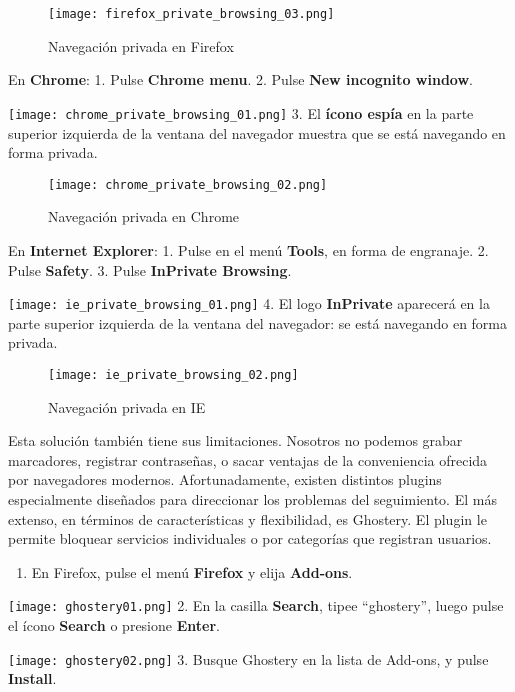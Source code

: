 \documentclass[10pt,a5paper,twoside,,]{book}
\providecommand{\tightlist}{%
  \setlength{\itemsep}{0pt}\setlength{\parskip}{0pt}}
\begin{document}
\begin{figure}[htbp]
\centering
\texttt{[image: firefox\_private\_browsing\_03.png]}
\caption{Navegación privada en Firefox}
\end{figure}

En \textbf{Chrome}: 1. Pulse \textbf{Chrome menu}. 2. Pulse \textbf{New
incognito window}.

\texttt{[image: chrome\_private\_browsing\_01.png]} 3. El \textbf{ícono
espía} en la parte superior izquierda de la ventana del navegador
muestra que se está navegando en forma privada.

\begin{figure}[htbp]
\centering
\texttt{[image: chrome\_private\_browsing\_02.png]}
\caption{Navegación privada en Chrome}
\end{figure}

En \textbf{Internet Explorer}: 1. Pulse en el menú \textbf{Tools}, en
forma de engranaje. 2. Pulse \textbf{Safety}. 3. Pulse \textbf{InPrivate
Browsing}.

\texttt{[image: ie\_private\_browsing\_01.png]} 4. El logo
\textbf{InPrivate} aparecerá en la parte superior izquierda de la
ventana del navegador: se está navegando en forma privada.

\begin{figure}[htbp]
\centering
\texttt{[image: ie\_private\_browsing\_02.png]}
\caption{Navegación privada en IE}
\end{figure}

Esta solución también tiene sus limitaciones. Nosotros no podemos grabar
marcadores, registrar contraseñas, o sacar ventajas de la conveniencia
ofrecida por navegadores modernos. Afortunadamente, existen distintos
plugins especialmente diseñados para direccionar los problemas del
seguimiento. El más extenso, en términos de características y
flexibilidad, es Ghostery. El plugin le permite bloquear servicios
individuales o por categorías que registran usuarios.

\begin{enumerate}
\def\labelenumi{\arabic{enumi}.}
\tightlist
\item
  En Firefox, pulse el menú \textbf{Firefox} y elija \textbf{Add-ons}.
\end{enumerate}

\texttt{[image: ghostery01.png]} 2. En la casilla \textbf{Search}, tipee
``ghostery'', luego pulse el ícono \textbf{Search} o presione
\textbf{Enter}.

\texttt{[image: ghostery02.png]} 3. Busque Ghostery en la lista de
Add-ons, y pulse \textbf{Install}.
\end{document}
